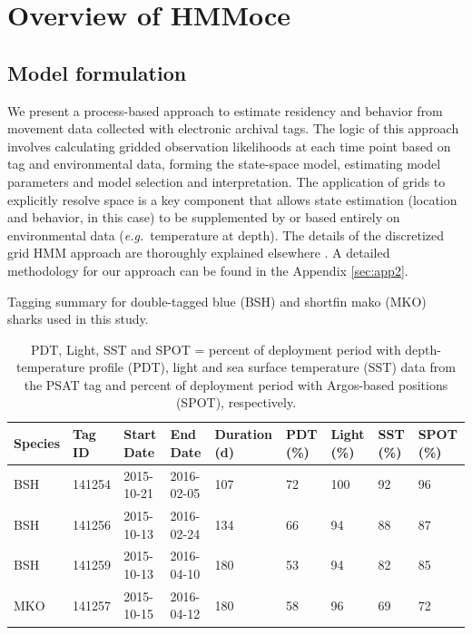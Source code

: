 \section{Overview of HMMoce}

\subsection{Model formulation}

We present a process-based approach to estimate residency and behavior
from movement data collected with electronic archival tags. The logic of
this approach involves calculating gridded observation likelihoods at
each time point based on tag and environmental data, forming the
state-space model, estimating model parameters and model selection and
interpretation. The application of grids to explicitly resolve space is
a key component that allows state estimation (location and behavior, in
this case) to be supplemented by or based entirely on environmental data
(\emph{e.g.}~temperature at depth). The details of the discretized grid HMM
approach are thoroughly explained elsewhere
\citep[\emph{e.g.}][]{Thygesen2009a, Pedersen2011}. A detailed methodology for
our approach can be found in the Appendix \ref{sec:app2}.

\begin{table}[b] %
\centering
\caption[Satellite tagging summary for \texttt{HMMoce} model data]{Tagging summary for double-tagged blue (BSH) and shortfin mako (MKO) sharks used in this study.}
\label{tab:c2t1}
\small
\begin{tabular}{p{1.25cm} p{1.25cm} p{2cm} p{2cm} p{1.5cm} p{1.25cm} p{1cm} p{1cm} p{1cm}}
\toprule
\textbf{Species} & \textbf{Tag ID} & \textbf{Start Date} & \textbf{End Date} & \textbf{Duration (d)} & \textbf{PDT (\%)} & \textbf{Light (\%)} & \textbf{SST (\%)} & \textbf{SPOT (\%)}\\
\midrule
BSH & 141254 & 2015-10-21 & 2016-02-05 & 107 & 72 & 100 & 92 & 96\\
BSH & 141256 & 2015-10-13 & 2016-02-24 & 134 & 66 & 94 & 88 & 87\\
BSH & 141259 & 2015-10-13 & 2016-04-10 & 180 & 53 & 94 & 82 & 85\\
MKO & 141257 & 2015-10-15 & 2016-04-12 & 180 & 58 & 96 & 69 & 72\\
\bottomrule
\end{tabular}
\caption*{PDT, Light, SST and SPOT = percent of deployment period with depth-temperature profile (PDT), light and sea surface temperature (SST) data from the PSAT tag and percent of deployment period with Argos-based positions (SPOT), respectively.}
\end{table}


